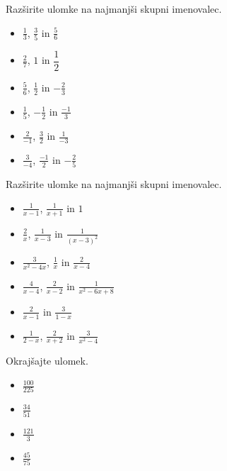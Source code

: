         
            \begin{naloga}
                Razširite ulomke na najmanjši skupni imenovalec.
                \begin{itemize}
                            \item $\frac{1}{3}$, $\frac{3}{5}$ in $\frac{5}{6}$ 
                            \item $\frac{2}{7}$, $1$ in $\dfrac{1}{2}$ 
                            \item $\frac{5}{6}$, $\frac{1}{2}$ in $-\frac{2}{3}$ 
                            \item $\frac{1}{5}$, $-\frac{1}{2}$ in $\frac{-1}{3}$ 
                            \item $\frac{2}{-1}$, $\frac{3}{2}$ in $\frac{1}{-3}$ 
                            \item $\frac{3}{-4}$, $\frac{-1}{2}$ in $-\frac{2}{5}$ 
                \end{itemize}
            \end{naloga}
        

        
            \begin{naloga}
                Razširite ulomke na najmanjši skupni imenovalec.
                \begin{itemize}
                            \item $\frac{1}{x-1}$, $\frac{1}{x+1}$ in $1$ 
                            \item $\frac{2}{x}$, $\frac{1}{x-3}$ in $\frac{1}{(x-3)^2}$ 
                            \item $\frac{3}{x^2-4x}$, $\frac{1}{x}$ in $\frac{2}{x-4}$ 
                            \item $\frac{4}{x-4}$, $\frac{2}{x-2}$ in $\frac{1}{x^2-6x+8}$ 
                            \item $\frac{2}{x-1}$ in $\frac{3}{1-x}$ 
                            \item $\frac{1}{2-x}$, $\frac{2}{x+2}$ in $\frac{3}{x^2-4}$ 
                \end{itemize}
            \end{naloga}
        

        
            \begin{naloga}
                Okrajšajte ulomek.
                \begin{itemize}
                    \item $\frac{100}{225}$ 
                    \item $\frac{34}{51}$ 
                    \item $\frac{121}{3}$ 
                    \item $\frac{45}{75}$ 
                \end{itemize}
            \end{naloga}
        


